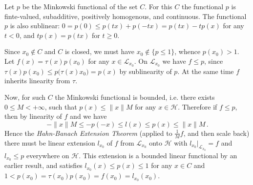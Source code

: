 \documentclass[a4paper]{article}
\newcommand{\Hcal}{\mathcal{H}}
\newcommand{\Lcal}{\mathcal{L}}
\begin{document}
Let $p$ be the Minkowski functional of the set $C$. For this $C$ the functional $p$
is finte-valued, subadditive, positively homogenous, and continuous. The functional
$p$ is also sublinear: $0 = p(0) \leq p(t x) + p(-t x) = p(t x) - t p(x)$ for any
$t < 0$, and $t p(x) = p(t x)$ for $t \geq 0$.

Since $x_0\notin C$ and $C$ is closed, we must have $x_0\notin \{p\leq 1\}$, whence
$p(x_0) > 1$. Let $f(x) = \tau(x) p(x_0)$ for any $x \in \Lcal_{x_0}$. On $\Lcal_{x_0}$
we have $f\leq p$, since $\tau(x) p(x_0) \leq p\bigl(\tau(x) x_0\bigr) = p(x)$ by
sublinearity of $p$. At the same time $f$ inherits linearity from $\tau$.

Now, for such $C$ the Minkowski functional is bounded, i.e. there exists $0\leq M <
+\infty$, such that $p(x) \leq \|x\| M$ for any $x\in \Hcal$. Therefore if $f\leq p$,
then by linearity of $f$ and we have
\begin{equation*}
  - \|x\| M
    \leq - p(-x)
    \leq l(x)
    \leq p(x)
    \leq \|x\| M
    \,.
\end{equation*}
Hence the {\it Hahn-Banach Extension Theorem} (applied to $\tfrac1M f$, and then
scale back) there must be linear extension $l_{x_0}$ of $f$ from $\Lcal_{x_0}$ onto
$\Hcal$ with $l_{x_0}\big\vert_{\Lcal_{x_0}} = f$ and $l_{x_0} \leq p$ everywhere
on $\Hcal$. This extension is a bounded linear functional by an earlier result, and
satisfies $l_{x_0}(x) \leq p(x) \leq 1$ for any $x\in C$ and $1 < p(x_0) = \tau(x_0) p(x_0)
= f(x_0) = l_{x_0}(x_0)$.

\end{document}
